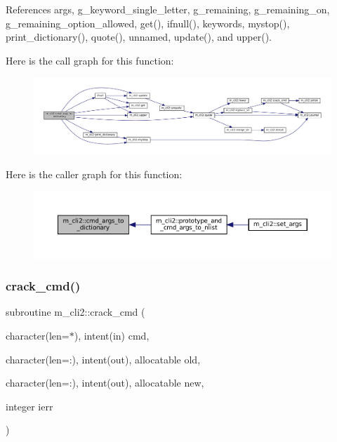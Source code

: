 References args, g\+\_\+keyword\+\_\+single\+\_\+letter, g\+\_\+remaining, g\+\_\+remaining\+\_\+on, g\+\_\+remaining\+\_\+option\+\_\+allowed, get(), ifnull(), keywords, mystop(), print\+\_\+dictionary(), quote(), unnamed, update(), and upper().

Here is the call graph for this function\+:\nopagebreak
\begin{figure}[H]
\begin{center}
\leavevmode
\includegraphics[width=350pt]{namespacem__cli2_a3348b0c76dadd62c536e06f82bcb0331_cgraph}
\end{center}
\end{figure}
Here is the caller graph for this function\+:\nopagebreak
\begin{figure}[H]
\begin{center}
\leavevmode
\includegraphics[width=350pt]{namespacem__cli2_a3348b0c76dadd62c536e06f82bcb0331_icgraph}
\end{center}
\end{figure}
\mbox{\label{namespacem__cli2_a710b26995119aee101959555b1bac8e2}} 
\subsubsection{\texorpdfstring{crack\+\_\+cmd()}{crack\_cmd()}}
{\footnotesize\ttfamily subroutine m\+\_\+cli2\+::crack\+\_\+cmd (\begin{DoxyParamCaption}\item[{character(len=$\ast$), intent(in)}]{cmd,  }\item[{character(len=\+:), intent(out), allocatable}]{old,  }\item[{character(len=\+:), intent(out), allocatable}]{new,  }\item[{integer}]{ierr }\end{DoxyParamCaption})\hspace{0.3cm}{\ttfamily [private]}}



